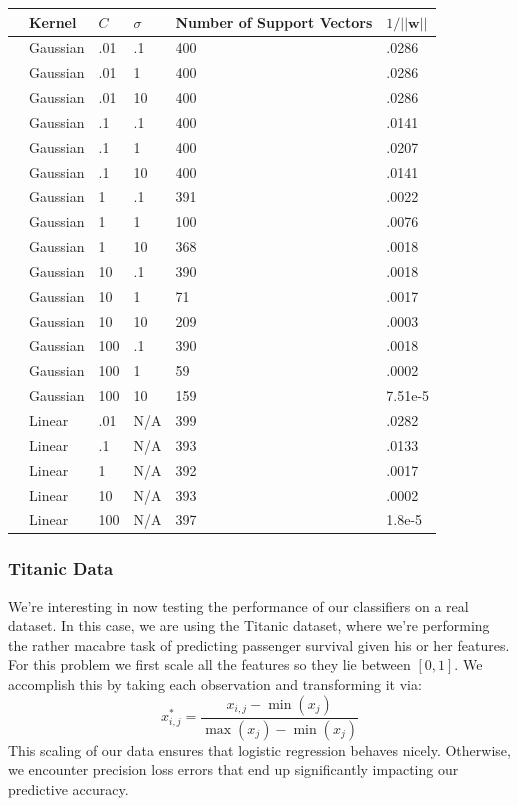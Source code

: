\documentclass[10pt]{article}
\begin{document}
\begin{table}
\centering
\begin{tabular}{llllll}
\toprule
{} &                        Kernel &      $C$ &   $\sigma$ &    Number of Support Vectors & $1/||\mathbf{w}||$ \\
\midrule
&    Gaussian &    .01 &    .1 &   400 &    .0286 \\
&    Gaussian &    .01 &    1 &   400 &    .0286 \\
&    Gaussian &    .01 &    10 &   400 &    .0286 \\
&    Gaussian &    .1 &    .1 &   400 &    .0141 \\
&    Gaussian &    .1 &    1 &   400 &    .0207 \\
&    Gaussian &    .1 &    10 &   400 &    .0141 \\
&    Gaussian &    1 &    .1 &   391 &    .0022 \\
&    Gaussian &    1 &    1 &   100 &    .0076 \\
&    Gaussian &    1 &    10 &   368 &    .0018 \\
&    Gaussian &    10 &    .1 &   390 &    .0018 \\
&    Gaussian &    10 &    1 &   71 &    .0017 \\
&    Gaussian &    10 &    10 &   209 &    .0003 \\
&    Gaussian &    100 &    .1 &   390 &    .0018 \\
&    Gaussian &    100 &    1 &   59 &    .0002 \\
&    Gaussian &    100 &    10 &   159 &    7.51e-5 \\
&    Linear &    .01 &    N/A &   399 &    .0282 \\
&    Linear &    .1 &    N/A &   393 &    .0133 \\
&    Linear &    1 &    N/A &   392 &    .0017 \\
&    Linear &    10 &    N/A &   393 &    .0002 \\
&    Linear &    100 &    N/A &   397 &    1.8e-5 \\
\midrule
\bottomrule
\end{tabular}
\end{table}


\subsubsection*{Titanic Data}
We're interesting in now testing the performance of our classifiers on a real dataset. In this case, we are using the Titanic dataset, where we're performing the rather macabre task of predicting passenger survival given his or her features. For this problem we first scale all the features so they lie between $[0,1]$. We accomplish this by taking each observation and transforming it via:
\begin{equation*}
	x_{i,j}^* = \frac{x_{i,j}-\min(x_j)}{\max(x_j) - \min(x_j)}
\end{equation*}
This scaling of our data ensures that logistic regression behaves nicely. Otherwise, we encounter precision loss errors that end up significantly impacting our predictive accuracy. 
\end{document}
